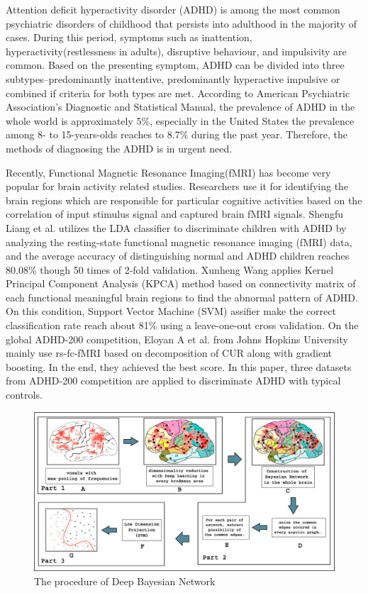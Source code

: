 \documentclass[10pt,twocolumn,letterpaper]{article}
\begin{document}
Attention deficit hyperactivity disorder (ADHD) is among the most common psychiatric disorders of childhood that persists into adulthood in the majority of cases\cite{1}. During this period, symptoms such as inattention, hyperactivity(restlessness in adults), disruptive behaviour, and impulsivity are common. Based on the presenting symptom, ADHD can be divided into three subtypes--predominantly inattentive, predominantly hyperactive impulsive or combined if criteria for both types are met. According to American Psychiatric Association’s Diagnostic and Statistical Manual, the prevalence of ADHD in the whole world is approximately 5\%, especially in the United States the prevalence among 8- to 15-years-olds reaches to 8.7\% during the past year. Therefore, the methods of diagnosing the ADHD is in urgent need.
 
 
 
Recently, Functional Magnetic Resonance Imaging(fMRI) has become very popular for brain activity related studies. Researchers use it for identifying the brain regions which are responsible for particular cognitive activities based on the correlation of input stimulus signal and captured brain fMRI signals. Shengfu Liang et al.\cite{3} utilizes the LDA classifier to discriminate children with ADHD by analyzing the resting-state functional magnetic resonance imaging (fMRI) data, and the average accuracy of distinguishing normal and ADHD children reaches 80.08\% though 50 times of 2-fold validation. Xunheng Wang\cite{4} applies Kernel Principal Component Analysis (KPCA) method based on connectivity matrix of each functional meaningful brain regions to find the abnormal pattern of ADHD. On this condition, Support Vector Machine (SVM) assifier make the correct classification rate reach about 81\% using a leave-one-out cross validation. On the global ADHD-200 competition, Eloyan A et al.\cite{6} from Johns Hopkins University mainly use rs-fc-fMRI based on decomposition of CUR along with gradient boosting. In the end, they achieved the best score. In this paper, three datasets from ADHD-200 competition are applied to discriminate ADHD with typical controls.

\begin{figure}[ht]
\begin{center}
   \includegraphics[width=0.8\linewidth]{overviews.eps}
\end{center}
   \caption{The procedure of Deep Bayesian Network}
\label{fig:overview}
\end{figure}
\end{document}
